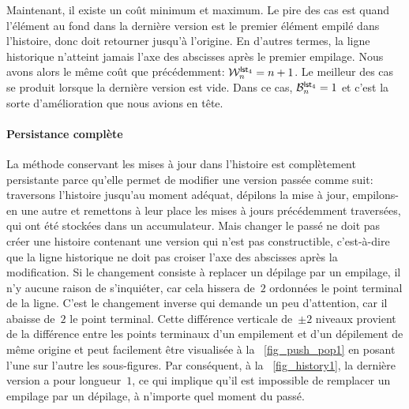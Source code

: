 Maintenant, il existe un coût minimum et maximum. Le pire des cas est
quand l'élément au fond dans la dernière version est le premier
élément empilé dans l'histoire, donc
 doit retourner jusqu'à
l'origine. En d'autres termes, la ligne historique n'atteint jamais
l'axe des abscisses après le premier empilage. Nous avons alors le
même coût que précédemment: \(\W{\fun{lst}_4}{n} = n +
1\).  Le meilleur des cas se produit lorsque la dernière version est vide. Dans ce cas, \(\B{\fun{lst}_4}{n} =
1\) et c'est la sorte d'amélioration que nous avions en tête.


\paragraph{Persistance complète}

La méthode conservant les mises à jour dans l'histoire est
complètement persistante parce qu'elle permet de modifier une version
passée comme suit: traversons l'histoire jusqu'au moment adéquat,
dépilons la mise à jour, empilons-en une autre et remettons à leur
place les mises à jours précédemment traversées, qui ont été stockées
dans un accumulateur. Mais changer le passé ne doit pas créer une
histoire contenant une version qui n'est pas constructible,
c'est-à-dire que la ligne historique ne doit pas croiser l'axe des
abscisses après la modification. Si le changement consiste à replacer
un dépilage par un empilage, il n'y aucune raison de s'inquiéter, car
cela hissera de~\(2\) ordonnées le point terminal de la ligne. C'est
le changement inverse qui demande un peu d'attention, car il abaisse
de~\(2\) le point terminal. Cette différence verticale de~\(\pm 2\)
niveaux provient de la différence entre les points terminaux d'un
empilement et d'un dépilement de même origine et peut facilement être
visualisée à la \fig~\vref{fig_push_pop1} en posant l'une sur l'autre
les sous-figures. Par conséquent, à la \fig~\ref{fig_history1}, la
dernière version a pour longueur~\(1\), ce qui implique qu'il est
impossible de remplacer un empilage par un dépilage, à n'importe quel
moment du passé.

